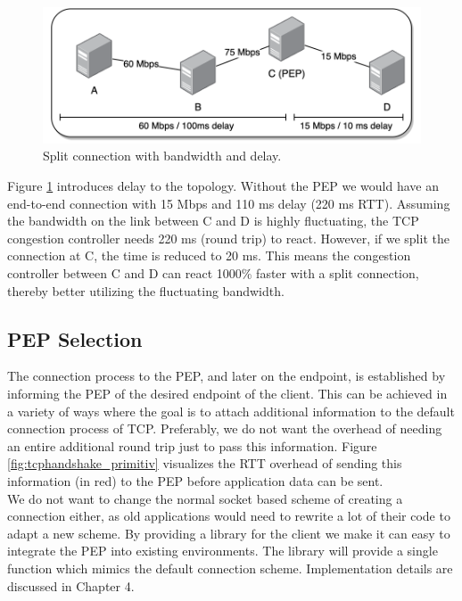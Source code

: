 \documentclass[a4paper,english, 11pt]{report}
\begin{document}
\begin{figure}[h!] %
	\centering
	\includegraphics[scale=0.6]{../diagrams/drawio/bandwidth_delay.png}
  	\caption{Split connection with bandwidth and delay.}
  	\label{fig:pep_bandwidth_delay}
\end{figure}

Figure \ref{fig:pep_bandwidth_delay} introduces delay to the topology. Without the PEP we would have an end-to-end connection with 15 Mbps and 110 ms delay (220 ms RTT). Assuming the bandwidth on the link between C and D is highly fluctuating, the TCP congestion controller needs 220 ms (round trip) to react. However, if we split the connection at C, the time is reduced to 20 ms. This means the congestion controller between C and D can react 1000\% faster with a split connection, thereby better utilizing the fluctuating bandwidth.
 
\subsection{PEP Selection}
The connection process to the PEP, and later on the endpoint, is established by informing the PEP of the desired endpoint of the client. This can be achieved in a variety of ways where the goal is to attach additional information to the default connection process of TCP. Preferably, we do not want the overhead of needing an entire additional round trip just to pass this information. Figure \ref{fig:tcphandshake_primitiv} visualizes the RTT overhead of sending this information (in red) to the PEP before application data can be sent.\\

We do not want to change the normal socket based scheme of creating a connection either, as old applications would need to rewrite a lot of their code to adapt a new scheme. By providing a library for the client we make it can easy to integrate the PEP into existing environments. The library will provide a single function which mimics the default connection scheme. Implementation details are discussed in Chapter 4.
\end{document}
